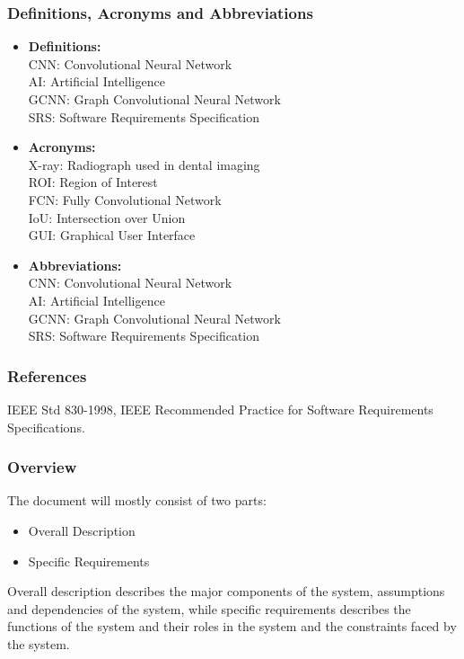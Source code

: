 \subsubsection{Definitions, Acronyms and Abbreviations}
\begin{itemize}
    \item \textbf{Definitions:}\\
    CNN: Convolutional Neural Network\\
    AI: Artificial Intelligence\\
    GCNN: Graph Convolutional Neural Network\\
    SRS: Software Requirements Specification\\
    
    \item \textbf{Acronyms:}\\
    X-ray: Radiograph used in dental imaging\\
    ROI: Region of Interest\\
    FCN: Fully Convolutional Network\\
    IoU: Intersection over Union\\
    GUI: Graphical User Interface\\
    
    \item \textbf{Abbreviations:}\\
    CNN: Convolutional Neural Network\\
    AI: Artificial Intelligence\\
    GCNN: Graph Convolutional Neural Network\\
    SRS: Software Requirements Specification\\
\end{itemize}


\subsubsection{References}
IEEE Std 830-1998, IEEE Recommended Practice for Software Requirements Specifications.

\subsubsection{Overview}
The document will mostly consist of two parts: 
\begin{itemize}
    \item Overall Description
    \item Specific Requirements 
\end{itemize}
Overall description describes the major components of the system, assumptions and dependencies of the system, while specific requirements describes the functions of the system and their roles in the system and the constraints faced by the system.

